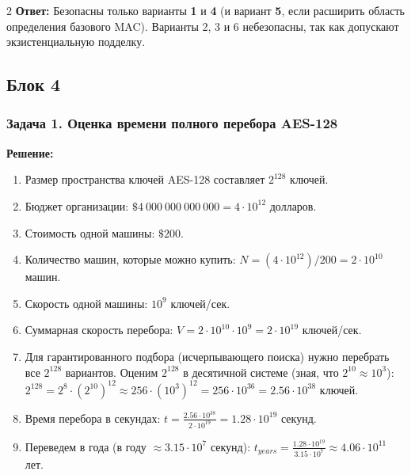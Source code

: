 ﻿\documentclass[10pt,a4paper,landscape]{extarticle}
\newcommand{\tightlist}{}
\begin{document}
\begin{multicols*}{2}
\textbf{Ответ:} Безопасны только варианты \textbf{1} и \textbf{4} (и вариант \textbf{5}, если расширить область определения базового MAC). Варианты 2, 3 и 6 небезопасны, так как допускают экзистенциальную подделку.

\subsection{Блок 4}\label{ux431ux43bux43eux43a-4}

\subsubsection{Задача 1. Оценка времени полного перебора AES-128}\label{ux437ux430ux434ux430ux447ux430-1.-ux43eux446ux435ux43dux43aux430-ux432ux440ux435ux43cux435ux43dux438-ux43fux43eux43bux43dux43eux433ux43e-ux43fux435ux440ux435ux431ux43eux440ux430-aes-128}

\textbf{Решение:}

\begin{enumerate}
\def\labelenumi{\arabic{enumi}.}
\tightlist
\item
  Размер пространства ключей AES-128 составляет \(2^{128}\) ключей.
\item
  Бюджет организации: \(\$4\ 000\ 000\ 000\ 000 = 4 \cdot 10^{12}\) долларов.
\item
  Стоимость одной машины: \(\$200\).
\item
  Количество машин, которые можно купить: \(N = (4 \cdot 10^{12}) / 200 = 2 \cdot 10^{10}\) машин.
\item
  Скорость одной машины: \(10^9\) ключей/сек.
\item
  Суммарная скорость перебора: \(V = 2 \cdot 10^{10} \cdot 10^9 = 2 \cdot 10^{19}\) ключей/сек.
\item
  Для гарантированного подбора (исчерпывающего поиска) нужно перебрать все \(2^{128}\) вариантов. Оценим \(2^{128}\) в десятичной системе (зная, что \(2^{10} \approx 10^3\)): \(2^{128} = 2^8 \cdot (2^{10})^{12} \approx 256 \cdot (10^3)^{12} = 256 \cdot 10^{36} = 2.56 \cdot 10^{38}\) ключей.
\item
  Время перебора в секундах: \(t = \frac{2.56 \cdot 10^{38}}{2 \cdot 10^{19}} = 1.28 \cdot 10^{19}\) секунд.
\item
  Переведем в года (в году \(\approx 3.15 \cdot 10^7\) секунд): \(t_{years} = \frac{1.28 \cdot 10^{19}}{3.15 \cdot 10^7} \approx 4.06 \cdot 10^{11}\) лет.
\end{enumerate}


\end{multicols*}
\end{document}
